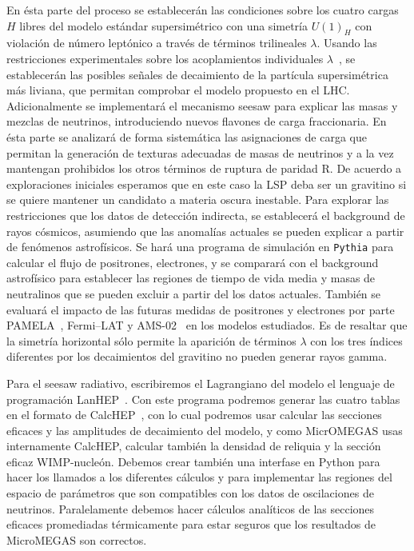 \begin{itemize}
\begin{proyecto}
  En ésta parte del proceso se establecerán las condiciones sobre los
  cuatro cargas $H$ libres del modelo estándar supersimétrico con una
  simetría $U(1)_H$ con violación de número leptónico a través de
  términos trilineales $\lambda$. Usando las restricciones
  experimentales sobre los acoplamientos individuales
  $\lambda$~\cite{Barbier:2004ez}, se establecerán las posibles señales de decaimiento
  de la partícula supersimétrica más liviana, que permitan comprobar
  el modelo propuesto en el LHC. Adicionalmente se 
  implementará el mecanismo seesaw para explicar las masas y mezclas de
  neutrinos, introduciendo nuevos flavones de carga fraccionaria.
  En ésta parte se
  analizará de forma sistemática las asignaciones de carga que
  permitan la generación de texturas adecuadas de masas de neutrinos y
  a la vez mantengan prohibidos los otros términos de ruptura de
  paridad R. De acuerdo a exploraciones iniciales esperamos que en
  este caso la LSP deba ser un gravitino si se quiere mantener un
  candidato a materia oscura inestable. Para explorar las
  restricciones que los datos de detección indirecta, se establecerá
  el background de rayos cósmicos, asumiendo que las anomalías
  actuales se pueden explicar a partir de fenómenos astrofísicos. Se
  hará una programa de simulación en \texttt{Pythia}
  \cite{Sjostrand:2006za} para calcular el flujo de positrones,
  electrones, y se comparará con el background astrofísico para
  establecer las regiones de tiempo de vida media y masas de
  neutralinos que se pueden excluir a partir del los datos
  actuales. También se evaluará el impacto de las futuras medidas de
  positrones y electrones por parte PAMELA~\cite{Adriani:2008zr},
  Fermi--LAT\cite{Abdo:2009zk} y AMS-02~\cite{ams:2009} en los modelos
  estudiados. Es de resaltar que la simetría horizontal sólo permite
  la aparición de términos $\lambda$ con los tres índices diferentes
  por los decaimientos del gravitino no pueden generar rayos gamma.
\end{proyecto}


\begin{proyecto}
  Para el seesaw radiativo, escribiremos el Lagrangiano del modelo el
  lenguaje de programación LanHEP~\cite{0805.0555}. Con este programa
  podremos generar las cuatro tablas en el formato de
  CalcHEP~\cite{hep-ph/0412191}, con lo cual podremos usar calcular
  las secciones eficaces y las amplitudes de decaimiento del modelo, y
  como MicrOMEGAS usas internamente CalcHEP, calcular también la
  densidad de reliquia y la sección eficaz WIMP-nucleón. Debemos crear
  también una interfase en Python para hacer los llamados a los
  diferentes cálculos y para implementar las regiones del espacio de
  parámetros que son compatibles con los datos de oscilaciones de
  neutrinos. Paralelamente debemos hacer cálculos analíticos de las
  secciones eficaces promediadas térmicamente para estar seguros que
  los resultados de MicroMEGAS son correctos.
\end{proyecto}



\end{itemize}
